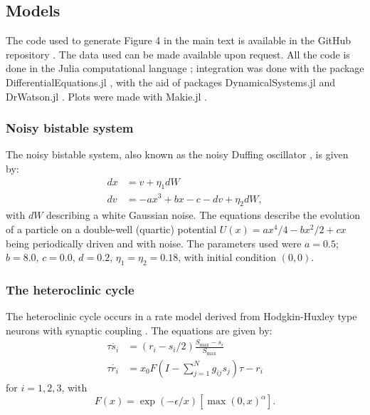 \subsection{Models}
The code used to generate Figure 4 in the main text is available in the GitHub repository \cite{rossi2022repository}. The data used can be made available upon request. All the code is done in the Julia computational language \cite{bezanson2017julia}; integration was done with the package DifferentialEquations.jl \cite{rackauckas2016differential}, with the aid of packages DynamicalSystems.jl \cite{datseris2018dynamical} and DrWatson.jl \cite{datseris2020drwatson}. Plots were made with Makie.jl \cite{danisch2021makie}.

\subsubsection{Noisy bistable system}
The noisy bistable system, also known as the noisy Duffing oscillator \cite{strogatz2002nonlinear}, is given by:
\begin{align}\label{eq:duffing}
    dx &= v + \eta_1 dW\\ 
    dv &= -ax^3 + bx -c -dv + \eta_2 dW,
\end{align}
with $dW$ describing a white Gaussian noise. The equations describe the evolution of a particle on a double-well (quartic) potential $U(x) = ax^4/4 -bx^2/2 +cx$ being periodically driven and with noise.
The parameters used were $a=0.5$; $b=8.0$, $c=0.0$, $d = 0.2$, $\eta_1= \eta_2 = 0.18$, with initial condition $(0, 0)$. 


\subsubsection{The heteroclinic cycle}
The heteroclinic cycle occurs in a rate model derived from Hodgkin-Huxley type neurons with synaptic coupling \cite{ashwin2011criteria}. The equations are given by:
\begin{align}
\tau\dot{s_i} &= \left( r_i - s_i/2 \right) \frac{S_\mathrm{max} - s_i}{S_\mathrm{max}} \\
\tau\dot{r_i} &= x_0 F\left( I - \sum_{j=1}^N g_{ij} s_j \right) \tau - r_i 
\end{align}
for $i = 1, 2, 3$, with 
\begin{equation}
    F(x) = \exp(-\epsilon/x) [\max(0, x)^\alpha ]. 
\end{equation}

